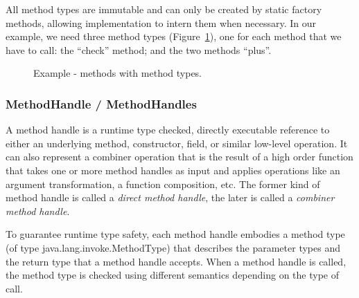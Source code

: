 \documentclass{sig-alternate}
\begin{document}
      All method types are immutable and can only be created by static factory methods,
      allowing implementation to intern them when necessary. 
      In our example, we need three method types (Figure~\ref{fooMTS}), one for each method that we have to call:
      the ``check'' method; and the two methods ``plus''.

      \begin{figure}[!ht]
        \centering \vspace{-1.5em}
        \caption{Example - methods with method types.}\vspace{-1em}
        \label{fooMTS}
      \end{figure}

    \subsubsection{MethodHandle / MethodHandles}
      \label{MH}

      A method handle is a runtime type checked, directly executable reference to
      either an underlying method, constructor, field, or similar low-level operation.
      It can also represent a combiner operation that is the result of a high order function
      that takes one or more method handles as input and applies operations like an argument transformation,
      a function composition, etc.
      The former kind of method handle is called a {\it direct method handle},
      the later is called a {\it combiner method handle}.

      To guarantee runtime type safety, each method handle embodies a method type (of type java.lang.invoke.MethodType)
      that describes the parameter types and the return type that a method handle accepts.
      When a method handle is called, the method type is checked using different semantics depending on the
      type of call.
\end{document}
